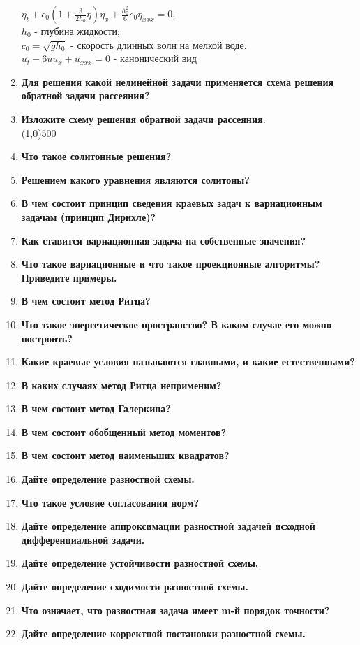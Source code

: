 \begin{enumerate}[label=\textbf{\underline{\arabic*.}}]
      $\eta_t+c_0(1+\frac3{2h_0}\eta)\eta_x+\frac{h_0^2}{6}c_0\eta_{xxx}=0 $,\\
      $h_0$ - глубина жидкости;\\
      $c_0 = \sqrt{gh_0}$ - скорость длинных волн на мелкой воде.\\
      $u_t-6uu_x+u_{xxx}=0 $ - канонический вид
\item \textbf{Для решения какой нелинейной задачи применяется схема решения обратной задачи рассеяния?}
\item \textbf{Изложите схему решения обратной задачи рассеяния.}\\
\line(1,0){500}
\item \textbf{Что такое солитонные решения?}
\item \textbf{Решением какого уравнения являются солитоны?}
\item \textbf{В чем состоит принцип сведения краевых задач к вариационным задачам (принцип Дирихле)?}
\item \textbf{Как ставится вариационная задача на собственные значения?}
\item \textbf{Что такое вариационные и что такое проекционные алгоритмы? Приведите примеры.}
\item \textbf{В чем состоит метод Ритца?}
\item \textbf{Что такое энергетическое пространство? В каком случае его можно построить?}
\item \textbf{Какие краевые условия называются главными, и какие естественными?}
\item \textbf{В каких случаях метод Ритца неприменим?}
\item \textbf{В чем состоит метод Галеркина?}
\item \textbf{В чем состоит обобщенный метод моментов?}
\item \textbf{В чем состоит метод наименьших квадратов?}
\item \textbf{Дайте определение разностной схемы.}
\item \textbf{Что такое условие согласования норм?}
\item \textbf{Дайте определение аппроксимации разностной задачей исходной дифференциальной задачи.}
\item \textbf{Дайте определение устойчивости разностной схемы.}
\item \textbf{Дайте определение сходимости разностной схемы.}
\item \textbf{Что означает, что разностная задача имеет m-й порядок точности?}
\item \textbf{Дайте определение корректной постановки разностной схемы.}

\end{enumerate}

